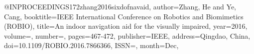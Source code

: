 @INPROCEEDINGS{172zhang2016sixdofnavaid,
author={Zhang, He and Ye, Cang},
booktitle={IEEE International Conference on Robotics and Biomimetics (ROBIO)}, 
title={An indoor navigation aid for the visually impaired}, 
year={2016},
volume={},
number={},
pages={467-472},
publisher={IEEE},
address={Qingdao, China},
doi={10.1109/ROBIO.2016.7866366},
ISSN={},
month={Dec},}